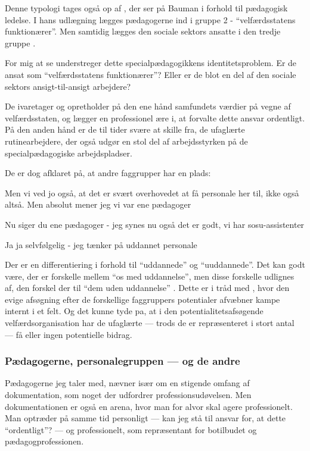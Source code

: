 Denne typologi tages også op af \citeauthor{kofodOrganisationOgLedelse2016}, der ser på Bauman i forhold til pædagogisk ledelse.
I hans udlægning lægges pædagogerne ind i gruppe 2 - “velfærdsstatens funktionærer”.
Men samtidig lægges den sociale sektors ansatte i den tredje gruppe \autocite[s. 166]{kofodOrganisationOgLedelse2016}.

For mig at se understreger dette specialpædagogikkens identitetsproblem.
Er de ansat som “velfærdsstatens funktionærer”?
Eller er de blot en del af den sociale sektors ansigt-til-ansigt arbejdere?

De ivaretager og opretholder på den ene hånd samfundets værdier på vegne af velfærdsstaten, og lægger en professionel ære i, at forvalte dette ansvar ordentligt.
På den anden hånd er de til tider svære at skille fra, de ufaglærte rutinearbejdere, der også udgør en stol del af arbejdsstyrken på de specialpædagogiske arbejdspladser. 

De er dog afklaret på, at andre faggrupper har en plads:

\begin{description}
\DMC
Men vi ved jo også, at det er svært overhovedet at få personale her til, ikke også altså.
Men absolut mener jeg vi var ene pædagoger

\AMB
Nu siger du ene pædagoger - jeg synes nu også det er godt, vi har sosu-assistenter

\DMC
Ja ja selvfølgelig - jeg tænker på uddannet personale
\end{description}

Der er en differentiering i forhold til “uddannede” og “uuddannede”.
Det kan godt være, der er forskelle mellem “os med uddannelse”, men disse forskelle udlignes af, den forskel der til “dem uden uddannelse” \autocite[s. 176]{baumanLiquidModernity2000}.
Dette er i tråd med \citeauthor{porsKerneloseKerneopgaverSkolen2015}, hvor den evige afsøgning efter de forskellige faggruppers potentialer afvæbner kampe internt i et felt.
Og det kunne tyde pa, at i den potentialitetsafsøgende velfærdsorganisation har de ufaglærte — trods de er repræsenteret i stort antal — få eller ingen potentielle bidrag.

\subsubsection{Pædagogerne, personalegruppen — og de andre}

Pædagogerne jeg taler med, nævner især om en stigende omfang af dokumentation, som noget der udfordrer professionsudøvelsen.
Men dokumentationen er også en arena, hvor man for alvor skal agere professionelt.
Man optræder på samme tid personligt — kan jeg stå til ansvar for, at dette “ordentligt”? — og professionelt, som repræsentant for botilbudet og pædagogprofessionen.

